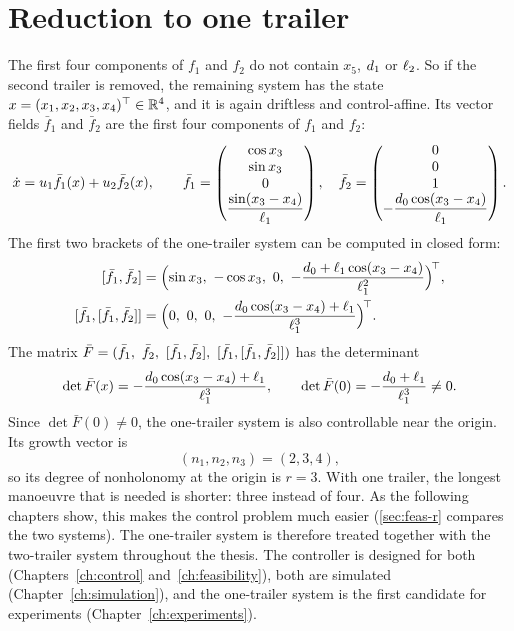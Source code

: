 \section{Reduction to one trailer}
\label{sec:onetrailer}

The first four components of $f_1$ and $f_2$ do not contain $x_5$, $d_1$ or
$\ell_2$. So if the second trailer is removed, the remaining system has the state
$x=(x_1,x_2,x_3,x_4)^\top\in\mathbb{R}^4$, and it is again driftless and
control-affine. Its vector fields $\bar f_1$ and $\bar f_2$ are the first four
components of $f_1$ and $f_2$:
\begin{equation}
  \dot x=u_1\bar f_1(x)+u_2\bar f_2(x),\qquad
  \bar f_1=\begin{pmatrix}\cos x_3\\ \sin x_3\\ 0\\ \dfrac{\sin(x_3-x_4)}{\ell_1}\end{pmatrix},\quad
  \bar f_2=\begin{pmatrix}0\\ 0\\ 1\\ -\dfrac{d_0\cos(x_3-x_4)}{\ell_1}\end{pmatrix}.
  \label{eq:onetrailer}
\end{equation}
The first two brackets of the one-trailer system can be computed in closed form:
\begin{align}
  \bracket{\bar f_1}{\bar f_2}&=\Bigl(\sin x_3,\ -\cos x_3,\ 0,\
        -\frac{\dzero+\lone\cos(x_3-x_4)}{\lone^{2}}\Bigr)^{\!\top},\\
  \bracket{\bar f_1}{\bracket{\bar f_1}{\bar f_2}}&=\Bigl(0,\ 0,\ 0,\
        -\frac{\dzero\cos(x_3-x_4)+\lone}{\lone^{3}}\Bigr)^{\!\top}.
\end{align}
The matrix $\bar F=(\bar f_1,\ \bar f_2,\ [\bar f_1,\bar f_2],\ [\bar f_1,[\bar f_1,\bar f_2]])$
has the determinant
\begin{equation}
  \det\bar F(x)=-\frac{d_0\cos(x_3-x_4)+\ell_1}{\ell_1^{3}},\qquad
  \det\bar F(0)=-\frac{d_0+\ell_1}{\ell_1^{3}}\neq0 .
\end{equation}
Since $\det\bar F(0)\neq0$, the one-trailer system is also controllable near the
origin. Its growth vector is
\begin{equation}
  (n_1,n_2,n_3)=(2,3,4),
\end{equation}
so its degree of nonholonomy at the origin is $r=3$. With one trailer, the
longest manoeuvre that is needed is shorter: three instead of four. As the
following chapters show, this makes the control problem much easier
(\cref{sec:feas-r} compares the two systems). The one-trailer system is
therefore treated together with the two-trailer system throughout the thesis.
The controller is designed for both (Chapters~\ref{ch:control}
and~\ref{ch:feasibility}), both are simulated (Chapter~\ref{ch:simulation}), and
the one-trailer system is the first candidate for experiments
(Chapter~\ref{ch:experiments}).


